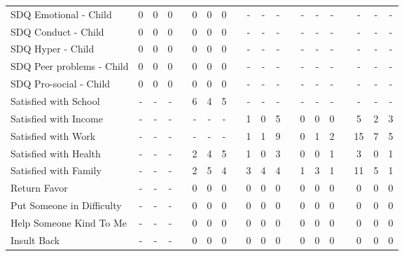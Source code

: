 \begin{center}
{\begin{longtable}{L{5cm} c c c p{.5cm} c c c p{.5cm} c c c p{.5cm} c c c p{.5cm} c c c}
SDQ Emotional - Child & 0 & 0 & 0 & & 0 & 0 & 0 & & - & - & - & & - & - & - & & - & - & - \\[.3em]
SDQ Conduct - Child & 0 & 0 & 0 & & 0 & 0 & 0 & & - & - & - & & - & - & - & & - & - & - \\[.3em]
SDQ Hyper - Child & 0 & 0 & 0 & & 0 & 0 & 0 & & - & - & - & & - & - & - & & - & - & - \\[.3em]
SDQ Peer problems - Child & 0 & 0 & 0 & & 0 & 0 & 0 & & - & - & - & & - & - & - & & - & - & - \\[.3em]
SDQ Pro-social - Child & 0 & 0 & 0 & & 0 & 0 & 0 & & - & - & - & & - & - & - & & - & - & - \\[.3em]
Satisfied with School & - & - & - & & 6 & 4 & 5 & & - & - & - & & - & - & - & & - & - & - \\[.3em]
Satisfied with Income & - & - & - & & - & - & - & & 1 & 0 & 5 & & 0 & 0 & 0 & & 5 & 2 & 3 \\[.3em]
Satisfied with Work & - & - & - & & - & - & - & & 1 & 1 & 9 & & 0 & 1 & 2 & & 15 & 7 & 5 \\[.3em]
Satisfied with Health & - & - & - & & 2 & 4 & 5 & & 1 & 0 & 3 & & 0 & 0 & 1 & & 3 & 0 & 1 \\[.3em]
Satisfied with Family & - & - & - & & 2 & 5 & 4 & & 3 & 4 & 4 & & 1 & 3 & 1 & & 11 & 5 & 1 \\[.3em]
Return Favor & - & - & - & & 0 & 0 & 0 & & 0 & 0 & 0 & & 0 & 0 & 0 & & 0 & 0 & 0 \\[.3em]
Put Someone in Difficulty & - & - & - & & 0 & 0 & 0 & & 0 & 0 & 0 & & 0 & 0 & 0 & & 0 & 0 & 0 \\[.3em]
Help Someone Kind To Me & - & - & - & & 0 & 0 & 0 & & 0 & 0 & 0 & & 0 & 0 & 0 & & 0 & 0 & 0 \\[.3em]
Insult Back & - & - & - & & 0 & 0 & 0 & & 0 & 0 & 0 & & 0 & 0 & 0 & & 0 & 0 & 0 \\[.3em]
\hline
\end{longtable}
}
\end{center}
